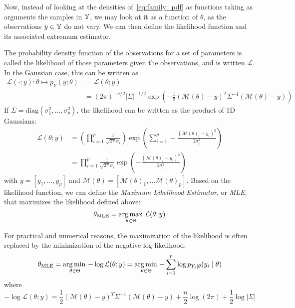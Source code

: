 \documentclass[../../Main_ManuscritThese.tex]{subfiles}
\begin{document}
Now, instead of looking at the densities of~\cref{eq:family_pdf} as functions taking as arguments the samples in $\mathbb{Y}$, we may look at it as a function of $\theta$, as the observations $y\in\mathbb{Y}$ do not vary. We can then define the likelihood function and its associated extremum estimator.
\begin{definition}
  \label{def:mle}
  The probability density function of the observations for a set of parameters is called the likelihood of those parameters given the observations, and is written $\mathcal{L}$. In the Gaussian case, this can be written as
  \begin{align}
    \label{eq:likelihood_definition}
    \mathcal{L}(\cdot ;y): \theta \mapsto p_{Y}(y;\theta) &= \mathcal{L}(\theta;y) \\
    &=(2\pi)^{-n/2}\lvert \Sigma \rvert^{-1/2}\exp\left(-\frac{1}{2}(\mathcal{M}(\theta) - y)^T\Sigma^{-1}(\mathcal{M}(\theta) - y)\right)
  \end{align}
  If $\Sigma = \mathrm{diag}(\sigma^2_1,\dots, \sigma^2_p)$, the likelihood can be written as the product of 1D Gaussians: 
  \begin{align}
    \mathcal{L}(\theta;y) &= \left(\prod_{i=1}^p\frac{1}{\sqrt{2\pi}\sigma_i}\right)\exp\left(\sum_{i=1}^p -\frac{(\mathcal{M}(\theta)_i - y_i)^2}{2\sigma^2_i}\right) \\
                          &= \prod_{i=1}^p\frac{1}{\sqrt{2\pi}\sigma_i}\exp\left(-\frac{(\mathcal{M}(\theta)_i - y_i)^2}{2\sigma^2_i}\right)
  \end{align}
  with $y = [y_1, \dots, y_p]$ and $\mathcal{M}(\theta) = [\mathcal{M}(\theta)_1,\dots \mathcal{M}(\theta)_p]$.
  Based on the likelihood function, we can define the \emph{Maximum Likelihood Estimator}, or \emph{MLE}, that maximizes the likelihood defined above:
  \begin{equation}
    \label{eq:def_MLE}
    {\theta}_{\mathrm{MLE}} = \operatorname*{arg\,max \,}_{\theta\in\Theta}\mathcal{L}(\theta;y)
  \end{equation}

\end{definition}
  For practical and numerical reasons, the maximization of the likelihood is often replaced by the minimization of the negative log-likelihood:
  \begin{equation}
    \label{eq:MLE_iid}
    {\theta}_{\mathrm{MLE}} = \operatorname*{arg\,min \,}_{\theta \in \Theta} -\log \mathcal{L}(\theta;y)= \operatorname*{arg\,min \,}_{\theta \in \Theta} -\sum_{i=1}^p\log p_{Y_i\mid \theta}(y_i \mid \theta) 
  \end{equation} 
  where
  \begin{equation}
    -\log\mathcal{L}(\theta;y) = \frac{1}{2}(\mathcal{M}(\theta) - y)^T\Sigma^{-1}(\mathcal{M}(\theta) - y)+  \frac{n}{2}\log(2\pi) + \frac{1}{2}\log\lvert \Sigma \rvert
  \end{equation}
\end{document}
